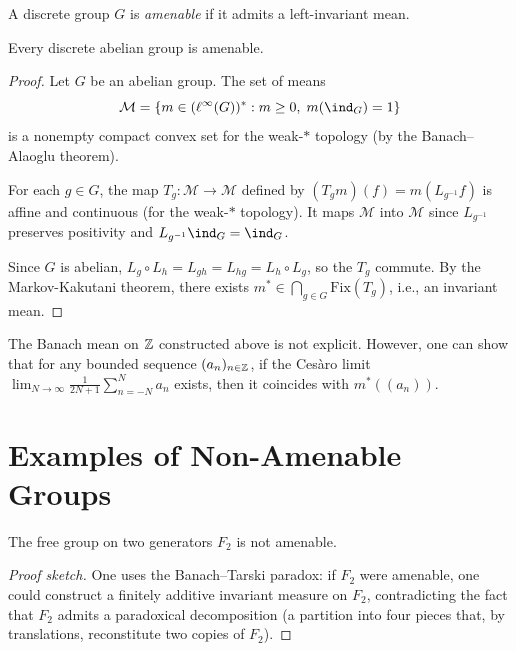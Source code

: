 \begin{definition}
A discrete group $G$ is \emph{amenable} if it admits a left-invariant mean.
\end{definition}

\begin{theorem}
\label{thm:abelian-amenable}
Every discrete abelian group is amenable.
\end{theorem}

\begin{proof}
Let $G$ be an abelian group. The set of means
\[
  \mathcal{M} = \{m \in (\ell^\infty(G))^* : m \geq 0, \; m(\ind_G) = 1\}
\]
is a nonempty compact convex set for the weak-$*$ topology (by the Banach--Alaoglu theorem).

For each $g \in G$, the map $T_g\colon \mathcal{M} \to \mathcal{M}$ defined by
$(T_g m)(f) = m(L_{g^{-1}} f)$ is affine and continuous (for the weak-$*$ topology). It
maps $\mathcal{M}$ into $\mathcal{M}$ since $L_{g^{-1}}$ preserves positivity and
$L_{g^{-1}} \ind_G = \ind_G$.

Since $G$ is abelian, $L_g \circ L_h = L_{gh} = L_{hg} = L_h \circ L_g$, so the $T_g$
commute. By the Markov-Kakutani theorem, there exists
$m^* \in \bigcap_{g \in G} \mathrm{Fix}(T_g)$, i.e., an invariant mean.
\end{proof}

\begin{example}
The Banach mean on $\mathbb{Z}$ constructed above is not explicit. However, one can show that for
any bounded sequence $(a_n)_{n \in \mathbb{Z}}$, if the Ces\`aro limit
$\lim_{N \to \infty} \frac{1}{2N+1} \sum_{n=-N}^{N} a_n$ exists, then it coincides with
$m^*((a_n))$.
\end{example}

\section{Examples of Non-Amenable Groups}

\begin{theorem}
The free group on two generators $F_2$ is not amenable.
\end{theorem}

\begin{proof}[Proof sketch]
One uses the Banach--Tarski paradox: if $F_2$ were amenable, one could construct a finitely
additive invariant measure on $F_2$, contradicting the fact that $F_2$ admits a paradoxical
decomposition (a partition into four pieces that, by translations, reconstitute two copies
of $F_2$).
\end{proof}

